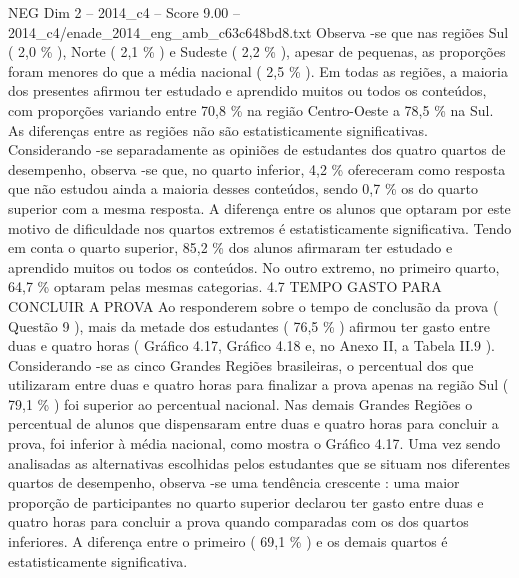 \begin{textsample}{NEG Dim 2 – 2014\_c4 – Score 9.00 – 2014\_c4/enade\_2014\_eng\_amb\_c63c648bd8.txt}
Observa -se que nas regiões Sul ( 2,0 \% ), Norte ( 2,1 \% ) e Sudeste ( 2,2 \% ), apesar de pequenas, as proporções foram menores do que a média nacional ( 2,5 \% ).
Em todas as regiões, a maioria dos presentes afirmou ter estudado e aprendido muitos ou todos os conteúdos, com proporções variando entre 70,8 \% na região Centro-Oeste a 78,5 \% na Sul.
As diferenças entre as regiões não são estatisticamente significativas.
Considerando -se separadamente as opiniões de estudantes dos quatro quartos de desempenho, observa -se que, no quarto inferior, 4,2 \% ofereceram como resposta que não estudou ainda a maioria desses conteúdos, sendo 0,7 \% os do quarto superior com a mesma resposta.
A diferença entre os alunos que optaram por este motivo de dificuldade nos quartos extremos é estatisticamente significativa.
Tendo em conta o quarto superior, 85,2 \% dos alunos afirmaram ter estudado e aprendido muitos ou todos os conteúdos.
No outro extremo, no primeiro quarto, 64,7 \% optaram pelas mesmas categorias. 4.7 TEMPO GASTO PARA CONCLUIR A PROVA Ao responderem sobre o tempo de conclusão da prova ( Questão 9 ), mais da metade dos estudantes ( 76,5 \% ) afirmou ter gasto entre duas e quatro horas ( Gráfico 4.17, Gráfico 4.18 e, no Anexo II, a Tabela II.9 ).
Considerando -se as cinco Grandes Regiões brasileiras, o percentual dos que utilizaram entre duas e quatro horas para finalizar a prova apenas na região Sul ( 79,1 \% ) foi superior ao percentual nacional.
Nas demais Grandes Regiões o percentual de alunos que dispensaram entre duas e quatro horas para concluir a prova, foi inferior à média nacional, como mostra o Gráfico 4.17.
Uma vez sendo analisadas as alternativas escolhidas pelos estudantes que se situam nos diferentes quartos de desempenho, observa -se uma tendência crescente : uma maior proporção de participantes no quarto superior declarou ter gasto entre duas e quatro horas para concluir a prova quando comparadas com os dos quartos inferiores.
A diferença entre o primeiro ( 69,1 \% ) e os demais quartos é estatisticamente significativa.

\end{textsample}
